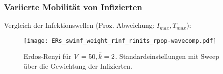 \begin{frame}[t]
    \frametitle{Variierte Mobilität von Infizierten}
    Vergleich der Infektionswellen (Proz. Abweichung: $I_{max}, T_{max}$):
    \begin{figure}[htpb]
        \centering
        \texttt{[image: ERs\_swinf\_weight\_rinf\_rinits\_rpop-wavecomp.pdf]}
        \caption{Erdos-Renyi für $V = 50, \bar{k}=2$. Standardeinstellungen mit Sweep über die
        Gewichtung der Infizierten.}%
        \label{fig:ERs_swinf_weight_rinf_rinits_rpop-wavecomp}
    \end{figure}
    
\end{frame}
